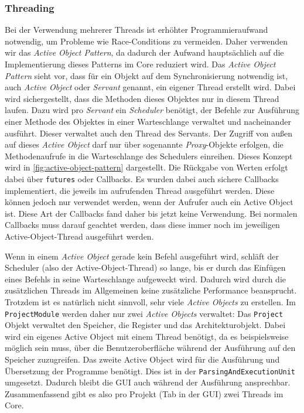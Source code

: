 \subsubsection{Threading}
\label{dev:threading}

Bei der Verwendung mehrerer Threads ist erhöhter Programmieraufwand
notwendig, um Probleme wie Race-Conditions zu vermeiden. Daher verwenden wir das
\emph{Active Object Pattern}, da dadurch der Aufwand hauptsächlich auf die
Implementierung dieses Patterns im Core reduziert wird. Das \emph{Active
Object Pattern} sieht vor, dass für ein Objekt auf dem Synchronisierung
notwendig ist, auch \emph{Active Object} oder \emph{Servant} genannt, ein
eigener Thread erstellt wird. Dabei wird sichergestellt, dass die Methoden
dieses Objektes nur in diesem Thread laufen. Dazu wird pro \emph{Servant} ein
\emph{Scheduler} benötigt, der Befehle zur Ausführung einer Methode des
Objektes in einer Warteschlange verwaltet und nacheinander ausführt. Dieser
verwaltet auch den Thread des Servants. Der Zugriff von außen auf dieses
\emph{Active Object} darf nur über sogenannte \emph{Proxy}-Objekte erfolgen,
die Methodenaufrufe in die Warteschlange des Schedulers einreihen. Dieses
Konzept wird in \autoref{fig:active-object-pattern} dargestellt. Die Rückgabe
von Werten erfolgt dabei über \texttt{futures} oder Callbacks. Es wurden dabei
auch sichere Callbacks implementiert, die jeweils im aufrufenden Thread
ausgeführt werden. Diese können jedoch nur verwendet werden, wenn der Aufrufer
auch ein Active Object ist. Diese Art der Callbacks fand daher bis jetzt keine
Verwendung. Bei normalen Callbacks muss darauf geachtet werden, dass diese immer
noch im jeweiligen Active-Object-Thread ausgeführt werden.

Wenn in einem \emph{Active Object} gerade kein Befehl ausgeführt wird, schläft
der Scheduler (also der Active-Object-Thread) so lange, bis er durch das
Einfügen eines Befehls in seine Warteschlange aufgeweckt wird. Dadurch wird
durch die zusätzlichen Threads im Allgemeinen keine zusätzliche Performance
beansprucht. Trotzdem ist es natürlich nicht sinnvoll, sehr viele \emph{Active
Objects} zu erstellen. Im \texttt{ProjectModule} werden daher nur zwei
\emph{Active Objects} verwaltet: Das \texttt{Project} Objekt verwaltet den
Speicher, die Register und das Architekturobjekt. Dabei wird ein eigenes Active
Object mit einem Thread benötigt, da es beispielsweise möglich sein muss, über
die Benutzeroberfläche während der Ausführung auf den Speicher zuzugreifen. Das
zweite Active Object wird für die Ausführung und Übersetzung der Programme
benötigt. Dies ist in der \texttt{ParsingAndExecutionUnit} umgesetzt. Dadurch
bleibt die GUI auch während der Ausführung ansprechbar. Zusammenfassend gibt es
also pro Projekt (Tab in der GUI) zwei Threads im Core.

